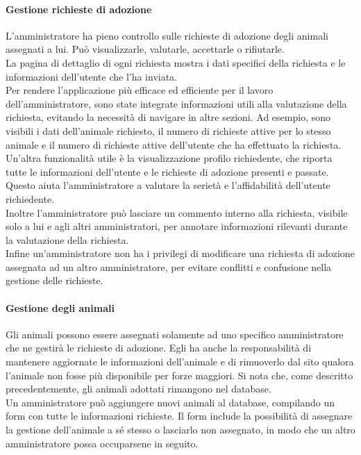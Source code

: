 \paragraph{Gestione richieste di adozione}
L'amministratore ha pieno controllo sulle richieste di adozione degli animali assegnati a lui. Può visualizzarle, valutarle, accettarle o rifiutarle.\\
La pagina di dettaglio di ogni richiesta mostra i dati specifici della richiesta e le informazioni dell'utente che l'ha inviata.\\
Per rendere l’applicazione più efficace ed efficiente per il lavoro dell’amministratore, sono state integrate informazioni utili alla valutazione della richiesta, evitando la necessità di navigare in altre sezioni.
Ad esempio, sono visibili i dati dell’animale richiesto, il numero di richieste attive per lo stesso animale e il numero di richieste attive dell’utente che ha effettuato la richiesta.\\
Un'altra funzionalità utile è la visualizzazione profilo richiedente, che riporta tutte le informazioni dell'utente e le richieste di adozione presenti e passate. Questo aiuta l'amministratore a valutare la serietà e l'affidabilità dell'utente richiedente.\\
Inoltre l'amministratore può lasciare un commento interno alla richiesta, visibile solo a lui e agli altri amministratori, per annotare informazioni rilevanti durante la valutazione della richiesta.\\
Infine un'amministratore non ha i privilegi di modificare una richiesta di adozione assegnata ad un altro amministratore, per evitare conflitti e confusione nella gestione delle richieste.
\paragraph{Gestione degli animali}
Gli animali possono essere assegnati solamente ad uno specifico amministratore che ne gestirà le richieste di adozione. Egli ha anche la responsabilità di mantenere aggiornate le informazioni dell'animale e di rimuoverlo dal sito qualora l'animale non fosse più disponibile per forze maggiori. Si nota che, come descritto precedentemente, gli animali adottati rimangono nel database.\\
Un amministratore può aggiungere nuovi animali al database, compilando un form con tutte le informazioni richieste. Il form include la possibilità di assegnare la gestione dell'animale a sé stesso o lasciarlo non assegnato, in modo che un altro amministratore possa occuparsene in seguito.
